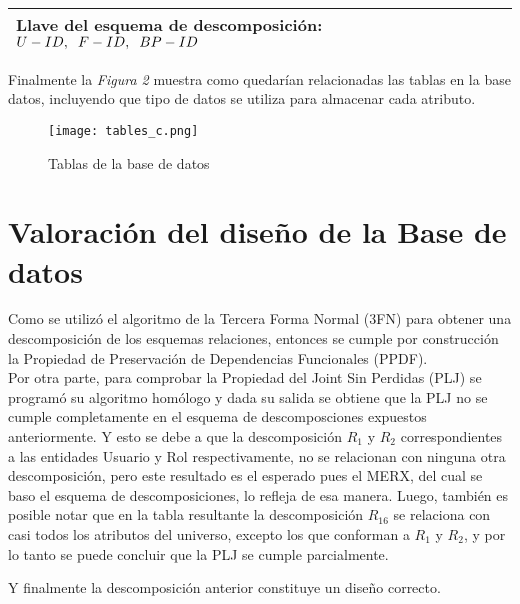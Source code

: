 \documentclass{report}
\begin{document}
\begin{tabularx}{\textwidth}{|X|}
                
        \midrule
        \textbf{Llave del esquema de descomposición:} $U-ID, \hspace{0.2cm} F-ID, \hspace{0.2cm} BP-ID$  \\
        \bottomrule
    \end{tabularx}

    \vspace*{0.5cm}

    Finalmente la \textit{Figura 2} muestra como quedarían relacionadas las tablas en la base datos, incluyendo que 
    tipo de datos se utiliza para almacenar cada atributo.\\

    \begin{figure}[htb]
        \centering
        \texttt{[image: tables\_c.png]}
        \caption{Tablas de la base de datos}
    \end{figure}

    \section*{Valoración del diseño de la Base de datos}
    Como se utilizó el algoritmo de la Tercera Forma Normal (3FN) para obtener una descomposición de los esquemas relaciones, 
    entonces se cumple por construcción la Propiedad de Preservación de Dependencias Funcionales (PPDF). \\

    Por otra parte, para comprobar la Propiedad del Joint Sin Perdidas (PLJ) se programó su algoritmo homólogo y dada su salida se obtiene que la PLJ no se cumple completamente en el esquema de descomposciones expuestos anteriormente.
    Y esto se debe a que la descomposición $R_1$ y $R_2$ correspondientes a las entidades Usuario y Rol respectivamente, no se relacionan con ninguna otra descomposición, pero este resultado es el esperado pues el MERX, del cual se baso el esquema de descomposiciones, lo refleja de esa manera.
    Luego, también es posible notar que en la tabla resultante la descomposición $R_{16}$  se relaciona con casi todos los atributos del universo, excepto los que conforman a $R_1$ y $R_2$, y por lo tanto se puede concluir que la PLJ se cumple parcialmente. \newline

    Y finalmente la descomposición anterior constituye un diseño correcto.
\end{document}
